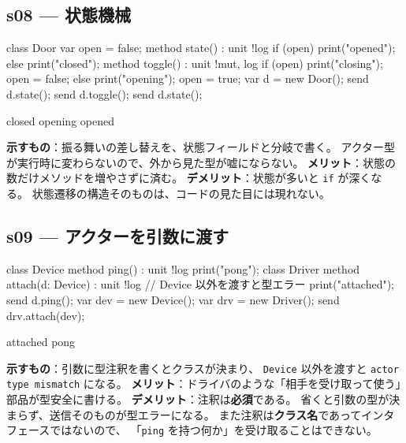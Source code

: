 \documentclass[11pt,a4paper]{ltjsarticle}
\theoremstyle{definition}
\theoremstyle{remark}
\begin{document}
\subsection{s08 --- 状態機械}
\begin{aipl}
class Door {
  var open = false;
  method state() : unit !{log} {
    if (open) { print("opened"); } else { print("closed"); }
  }
  method toggle() : unit !{mut, log} {
    if (open) { print("closing"); open = false; }
    else      { print("opening"); open = true; }
  }
}
var d = new Door();
send d.state();
send d.toggle();
send d.state();
\end{aipl}
\begin{term}
closed
opening
opened
\end{term}
\textbf{示すもの}：振る舞いの差し替えを、状態フィールドと分岐で書く。
アクター型が実行時に変わらないので、外から見た型が嘘にならない。
\textbf{メリット}：状態の数だけメソッドを増やさずに済む。
\textbf{デメリット}：状態が多いと \texttt{if} が深くなる。
状態遷移の構造そのものは、コードの見た目には現れない。

\subsection{s09 --- アクターを引数に渡す}
\begin{aipl}
class Device { method ping() : unit !{log} { print("pong"); } }
class Driver {
  method attach(d: Device) : unit !{log} {   // Device 以外を渡すと型エラー
    print("attached");
    send d.ping();
  }
}
var dev = new Device();
var drv = new Driver();
send drv.attach(dev);
\end{aipl}
\begin{term}
attached
pong
\end{term}
\textbf{示すもの}：引数に型注釈を書くとクラスが決まり、
\texttt{Device} 以外を渡すと \texttt{actor type mismatch} になる。
\textbf{メリット}：ドライバのような「相手を受け取って使う」部品が型安全に書ける。
\textbf{デメリット}：注釈は\textbf{必須}である。
省くと引数の型が決まらず、送信そのものが型エラーになる。
また注釈は\textbf{クラス名}であってインタフェースではないので、
「\texttt{ping} を持つ何か」を受け取ることはできない。
\end{document}
